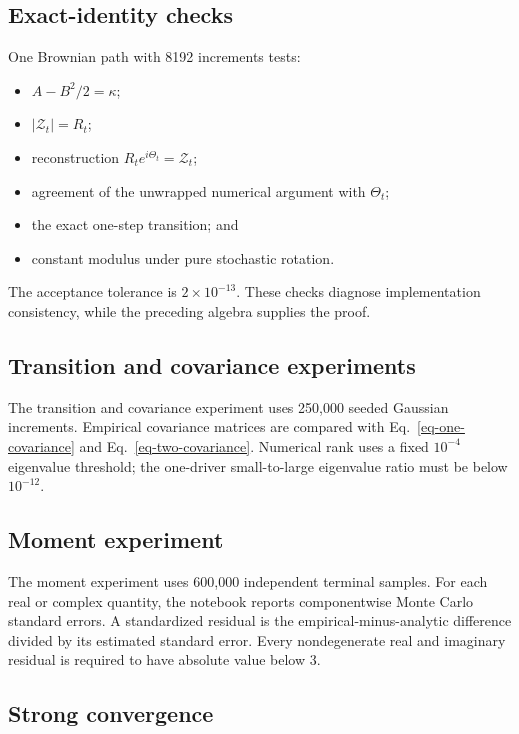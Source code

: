 \documentclass[
  english,
  10pt,
  letterpaper,
  DIV=11,
  numbers=noendperiod]{scrartcl}
\providecommand{\tightlist}{%
  \setlength{\itemsep}{0pt}\setlength{\parskip}{0pt}}
\begin{document}
\subsection{Exact-identity checks}\label{exact-identity-checks}

One Brownian path with 8192 increments tests:

\begin{itemize}
\tightlist
\item
  \(A-B^2/2=\kappa\);
\item
  \(|\mathcal Z_t|=R_t\);
\item
  reconstruction \(R_te^{i\Theta_t}=\mathcal Z_t\);
\item
  agreement of the unwrapped numerical argument with \(\Theta_t\);
\item
  the exact one-step transition; and
\item
  constant modulus under pure stochastic rotation.
\end{itemize}

The acceptance tolerance is \(2\times10^{-13}\). These checks diagnose
implementation consistency, while the preceding algebra supplies the
proof.

\subsection{Transition and covariance
experiments}\label{transition-and-covariance-experiments}

The transition and covariance experiment uses 250,000 seeded Gaussian
increments. Empirical covariance matrices are compared with
Eq.~\ref{eq-one-covariance} and Eq.~\ref{eq-two-covariance}. Numerical
rank uses a fixed \(10^{-4}\) eigenvalue threshold; the one-driver
small-to-large eigenvalue ratio must be below \(10^{-12}\).

\subsection{Moment experiment}\label{moment-experiment}

The moment experiment uses 600,000 independent terminal samples. For
each real or complex quantity, the notebook reports componentwise Monte
Carlo standard errors. A standardized residual is the
empirical-minus-analytic difference divided by its estimated standard
error. Every nondegenerate real and imaginary residual is required to
have absolute value below 3.

\subsection{Strong convergence}\label{strong-convergence}
\end{document}
